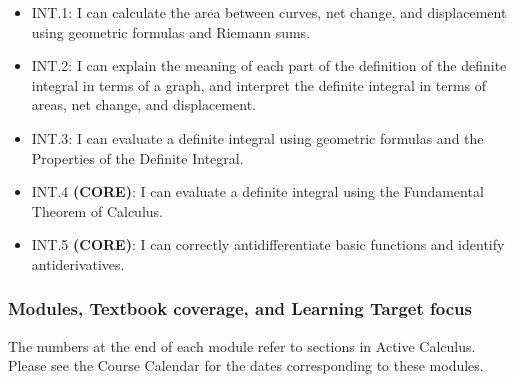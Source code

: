 \documentclass[]{article}
\providecommand{\tightlist}{%
  \setlength{\itemsep}{0pt}\setlength{\parskip}{0pt}}
\begin{document}
\begin{itemize}
  \begin{itemize}
  \tightlist
  \item
    INT.1: I can calculate the area between curves, net change, and
    displacement using geometric formulas and Riemann sums.
  \item
    INT.2: I can explain the meaning of each part of the definition of
    the definite integral in terms of a graph, and interpret the
    definite integral in terms of areas, net change, and displacement.
  \item
    INT.3: I can evaluate a definite integral using geometric formulas
    and the Properties of the Definite Integral.
  \item
    INT.4 \textbf{(CORE)}: I can evaluate a definite integral using the
    Fundamental Theorem of Calculus.
  \item
    INT.5 \textbf{(CORE)}: I can correctly antidifferentiate basic
    functions and identify antiderivatives.
  \end{itemize}
\end{itemize}

\hypertarget{modules-textbook-coverage-and-learning-target-focus}{%
\subsubsection{Modules, Textbook coverage, and Learning Target
focus}\label{modules-textbook-coverage-and-learning-target-focus}}

The numbers at the end of each module refer to sections in Active
Calculus. Please see the Course Calendar for the dates corresponding to
these modules.
\end{document}
